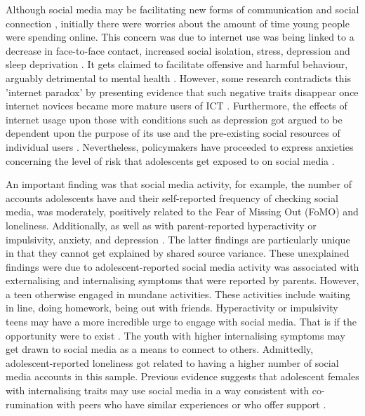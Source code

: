\documentclass{sigchi}
\begin{document}
	Although social media may be facilitating new forms of communication and social connection \cite{baker2008blogging}, initially there were worries about the amount of time young people were spending online. This concern was due to internet use was being linked to a decrease in face-to-face contact, increased social isolation, stress, depression and sleep deprivation \cite{kraut1998internet, espinoza2011pervasiveness}. It gets claimed to facilitate offensive and harmful behaviour, arguably detrimental to mental health \cite{mesch2009parental}. However, some research contradicts this 'internet paradox' \cite{o2018social} by presenting evidence that such negative traits disappear once internet novices became more mature users of ICT \cite{kraut2002internet}. Furthermore, the effects of internet usage upon those with conditions such as depression got argued to be dependent upon the purpose of its use and the pre-existing social resources of individual users \cite{bessiere2008effects}. Nevertheless, policymakers have proceeded to express anxieties concerning the level of risk that adolescents get exposed to on social media \cite{boyd2014s}.
	
	An important finding was that social media activity, for example, the number of accounts adolescents have and their self-reported frequency of checking social media, was moderately, positively related to the Fear of Missing Out (FoMO) and loneliness. Additionally, as well as with parent-reported hyperactivity or impulsivity, anxiety, and depression \cite{barry2017adolescent}. The latter findings are particularly unique in that they cannot get explained by shared source variance. These unexplained findings were due to adolescent-reported social media activity was associated with externalising and internalising symptoms that were reported by parents. However, a teen otherwise engaged in mundane activities. These activities include waiting in line, doing homework, being out with friends. Hyperactivity or impulsivity teens may have a more incredible urge to engage with social media. That is if the opportunity were to exist \cite{barry2017adolescent}. The youth with higher internalising symptoms may get drawn to social media as a means to connect to others. Admittedly, adolescent-reported loneliness got related to having a higher number of social media accounts in this sample. Previous evidence suggests that adolescent females with internalising traits may use social media in a way consistent with co-rumination with peers who have similar experiences or who offer support \cite{ehrenreich2016adolescents}.
	
\end{document}
